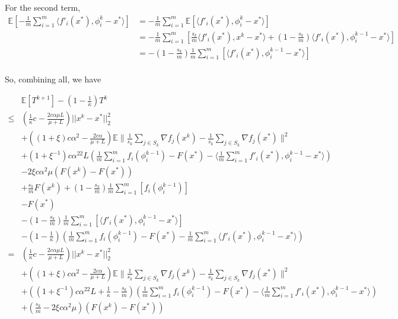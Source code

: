 \documentclass[12pt]{article}
\begin{document}
				For the second term, 
				\begin{align*}
				\mathbb{E} \left[  -  \frac{1}{m}  \sum_{i =1}^{m} \langle f'_i(x^*), \phi_i^{k} - x^*\rangle \right] &= -  \frac{1}{m}  \sum_{i =1}^{m} \mathbb{E} \left[  \langle f'_i(x^*), \phi_i^{k} - x^*\rangle \right] \\
				&=  -\frac{1}{m}  \sum_{i =1}^{m} \left[  \frac{s_k}{m}  \langle f'_i(x^*), x^k - x^*\rangle  +  \left(1 - \frac{s_k}{m} \right )  \langle f'_i(x^*), \phi_i^{k-1} - x^*\rangle \right] \\
				&=    -\left(1 - \frac{s_k}{m} \right ) \frac{1}{m}  \sum_{i =1}^{m} \left[   \langle f'_i(x^*), \phi_i^{k-1} - x^*\rangle \right] \\
				\end{align*}
		
		
				So, combining all, we have
		
		
					\begin{align*}
						&\mathbb{E}\left[ T^{k+1} \right] - \left(1-\frac{1}{\kappa} \right) T^k \\
						\leq  &(\frac{1}{\kappa} c-\frac{2c \alpha \mu L}{\mu+L})||x^k-x^*||_2^2 \\
					&+ ((1+\xi)c \alpha^2 - \frac{2c \alpha }{\mu+L})\mathbb{E} \| \frac{1}{s_k} \sum_{j \in S_k}   \nabla f_j(x^k) -\frac{1}{s_k} \sum_{j \in S_k}   \nabla f_j(x^*) \|^2\\
					&+(1+\xi^{-1})c \alpha^22L(\frac{1}{m}\sum_{i =1}^{m}  f_i(\phi_i^{k-1})   - F(x^*)  -  \langle \frac{1 }{m} \sum_{i =1}^{m}   f'_i(x^*), \phi_i^{k-1} - x^*\rangle) \\
				&- 2 \xi c \alpha^2 \mu (F(x^k) - F(x^*)) \\
				& +\frac{s_k}{m}  F(x^k) + \left(1 - \frac{s_k}{m} \right )\frac{1}{m} \sum_{i =1}^{m} \left[  f_i(\phi_i^{k-1}) \right]\\
				& - F(x^*) \\
				&   -\left(1 - \frac{s_k}{m} \right ) \frac{1}{m}  \sum_{i =1}^{m} \left[   \langle f'_i(x^*), \phi_i^{k-1} - x^*\rangle \right] \\
				&- \left(1-\frac{1}{\kappa} \right) (\frac{1}{m} \sum_{i =1}^{m} f_i(\phi_i^{k-1}) - F(x^*) - \frac{1}{m}  \sum_{i =1}^{m} \langle f'_i(x^*), \phi_i^{k-1} - x^*\rangle )\\
				=&(\frac{1}{\kappa} c-\frac{2c \alpha \mu L}{\mu+L})||x^k-x^*||_2^2 \\
					&+ ((1+\xi)c \alpha^2 - \frac{2c \alpha }{\mu+L})\mathbb{E} \| \frac{1}{s_k} \sum_{j \in S_k}   \nabla f_j(x^k) -\frac{1}{s_k} \sum_{j \in S_k}   \nabla f_j(x^*) \|^2\\
					&+((1+\xi^{-1})c \alpha^22L+\frac{1}{\kappa}- \frac{s_k}{m} )(\frac{1}{m}\sum_{i =1}^{m}  f_i(\phi_i^{k-1})   - F(x^*)  -  \langle \frac{1 }{m} \sum_{i =1}^{m}   f'_i(x^*), \phi_i^{k-1} - x^*\rangle) \\
				&+(\frac{s_k}{m}- 2 \xi c \alpha^2 \mu) (F(x^k) - F(x^*)) \\
						\end{align*}
		
\end{document}
